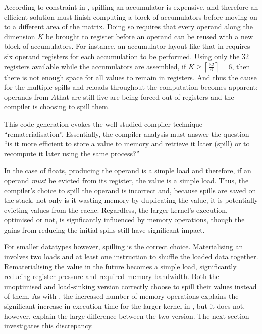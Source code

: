 \documentclass[\main/thesis.tex]{subfiles}
\begin{document}
According to constraint  in , spilling an accumulator is expensive, and therefore an efficient solution must finish computing a block of accumulators before moving on to a different area of the matrix.
Doing so requires that every operand along the dimension $K$ be brought to register before an operand can be reused with a new block of accumulators.
For instance, an accumulator layout like that in  requires six operand registers for each accumulation to be performed.
Using only the 32 registers available while the accumulators are assembled, if $K \geq \left\lceil \frac{32}{6} \right\rceil = 6$, then there is not enough space for all values to remain in registers.
And thus the cause for the multiple spills and reloads throughout the computation becomes apparent: operands from $A$\footnotemark that are still \gls{live} are being forced out of registers and the compiler is choosing to spill them.

This code generation evokes the well-studied compiler technique ``\gls{rematerialisation}''.
Essentially, the compiler analysis must answer the question ``is it more efficient to store a value to memory and retrieve it later (\gls{spill}) or to recompute it later using the same process?''

In the case of floats, producing the operand is a simple load and therefore, if an operand \emph{must} be evicted from its register,  the value is a simple load.
Thus, the compiler's choice to spill the operand is incorrect and, because spills are saved on the stack, not only is it wasting memory by duplicating the value, it is potentially evicting values from the cache.
Regardless, the larger kernel's execution, optimised or not, is signficantly influenced by memory operations, though the gains from reducing the initial spills still have significant impact.

For smaller datatypes however, spilling is the correct choice.
Materialising an  involves two loads and at least one instruction to shuffle the loaded data together.
Rematerialising the value in the future becomes a simple load, significantly reducing register pressure and required memory bandwidth.
Both the unoptimised and load-sinking version correctly choose to spill their values instead of  them.
As with , the increased number of memory operations explains the significant increase in execution time for the larger  kernel in , but it does not, however, explain the large difference between the two version.
The next section investigates this discrepancy.
\end{document}
